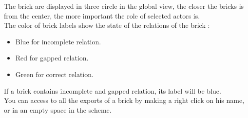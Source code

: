 The brick are displayed in three circle in the global view, the closer the bricks is from the center, the more important the role of selected actors is.\\

The color of brick labels show the state of the relations of the brick :\\
\begin{itemize}
\item Blue for incomplete relation.
\item Red for gapped relation.
\item Green for correct relation.\\
\end{itemize}

If a brick contains incomplete and gapped relation, its label will be blue.\\

You can access to all the exports of a brick by making a right click on his name, or in an empty space in the scheme.\\

